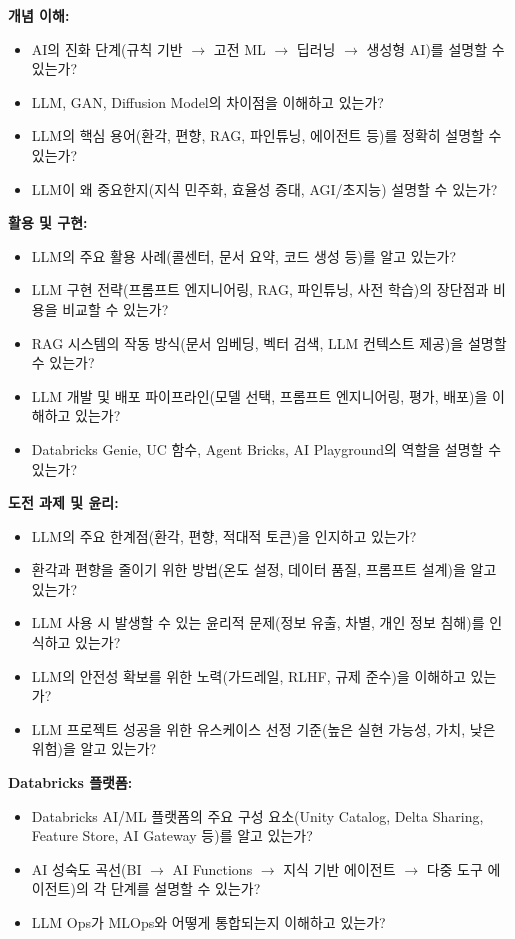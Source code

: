 \documentclass[11pt,a4paper]{article}
\begin{document}
\begin{tcolorbox}[mybox={LLM 학습 및 프로젝트 점검표}]
    \textbf{개념 이해:}
    \begin{itemize}
        \item AI의 진화 단계(규칙 기반 $\rightarrow$ 고전 ML $\rightarrow$ 딥러닝 $\rightarrow$ 생성형 AI)를 설명할 수 있는가?
        \item LLM, GAN, Diffusion Model의 차이점을 이해하고 있는가?
        \item LLM의 핵심 용어(환각, 편향, RAG, 파인튜닝, 에이전트 등)를 정확히 설명할 수 있는가?
        \item LLM이 왜 중요한지(지식 민주화, 효율성 증대, AGI/초지능) 설명할 수 있는가?
    \end{itemize}

    \textbf{활용 및 구현:}
    \begin{itemize}
        \item LLM의 주요 활용 사례(콜센터, 문서 요약, 코드 생성 등)를 알고 있는가?
        \item LLM 구현 전략(프롬프트 엔지니어링, RAG, 파인튜닝, 사전 학습)의 장단점과 비용을 비교할 수 있는가?
        \item RAG 시스템의 작동 방식(문서 임베딩, 벡터 검색, LLM 컨텍스트 제공)을 설명할 수 있는가?
        \item LLM 개발 및 배포 파이프라인(모델 선택, 프롬프트 엔지니어링, 평가, 배포)을 이해하고 있는가?
        \item Databricks Genie, UC 함수, Agent Bricks, AI Playground의 역할을 설명할 수 있는가?
    \end{itemize}

    \textbf{도전 과제 및 윤리:}
    \begin{itemize}
        \item LLM의 주요 한계점(환각, 편향, 적대적 토큰)을 인지하고 있는가?
        \item 환각과 편향을 줄이기 위한 방법(온도 설정, 데이터 품질, 프롬프트 설계)을 알고 있는가?
        \item LLM 사용 시 발생할 수 있는 윤리적 문제(정보 유출, 차별, 개인 정보 침해)를 인식하고 있는가?
        \item LLM의 안전성 확보를 위한 노력(가드레일, RLHF, 규제 준수)을 이해하고 있는가?
        \item LLM 프로젝트 성공을 위한 유스케이스 선정 기준(높은 실현 가능성, 가치, 낮은 위험)을 알고 있는가?
    \end{itemize}

    \textbf{Databricks 플랫폼:}
    \begin{itemize}
        \item Databricks AI/ML 플랫폼의 주요 구성 요소(Unity Catalog, Delta Sharing, Feature Store, AI Gateway 등)를 알고 있는가?
        \item AI 성숙도 곡선(BI $\rightarrow$ AI Functions $\rightarrow$ 지식 기반 에이전트 $\rightarrow$ 다중 도구 에이전트)의 각 단계를 설명할 수 있는가?
        \item LLM Ops가 MLOps와 어떻게 통합되는지 이해하고 있는가?
    \end{itemize}
\end{tcolorbox}
\end{document}
